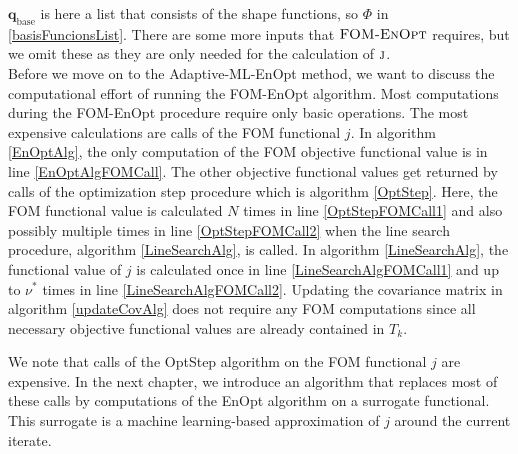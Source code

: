 $\mathbf{q}_\mathrm{base}$ is here a list that consists of the shape functions, so $\Phi$ in \eqref{basisFuncionsList}. There are some more inputs that $\textproc{FOM-EnOpt}$ requires, but we omit these as they are only needed for the calculation of $\textproc{j}$.\\

Before we move on to the Adaptive-ML-EnOpt method, we want to discuss the computational effort of running the FOM-EnOpt algorithm. Most computations during the FOM-EnOpt procedure require only basic operations. The most expensive calculations are calls of the FOM functional $j$. In algorithm \ref{EnOptAlg}, the only computation of the FOM objective functional value is in line \ref{EnOptAlgFOMCall}. The other objective functional values get returned by calls of the optimization step procedure which is algorithm \ref{OptStep}. Here, the FOM functional value is calculated $N$ times in line \ref{OptStepFOMCall1} and also possibly multiple times in line \ref{OptStepFOMCall2} when the line search procedure, algorithm \ref{LineSearchAlg}, is called. In algorithm \ref{LineSearchAlg}, the functional value of $j$ is calculated once in line \ref{LineSearchAlgFOMCall1} and up to $\nu^*$ times in line \ref{LineSearchAlgFOMCall2}. Updating the covariance matrix in algorithm \ref{updateCovAlg} does not require any FOM computations since all necessary objective functional values are already contained in $T_k$.

We note that calls of the OptStep algorithm on the FOM functional $j$ are expensive. In the next chapter, we introduce an algorithm that replaces most of these calls by computations of the EnOpt algorithm on a surrogate functional. This surrogate is a machine learning-based approximation of $j$ around the current iterate.